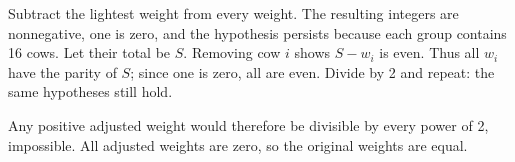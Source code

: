 Subtract the lightest weight from every weight. The resulting integers are nonnegative, one is zero, and the hypothesis persists because each group contains 16 cows. Let their total be $S$. Removing cow $i$ shows $S-w_i$ is even. Thus all $w_i$ have the parity of $S$; since one is zero, all are even. Divide by 2 and repeat: the same hypotheses still hold.

Any positive adjusted weight would therefore be divisible by every power of 2, impossible. All adjusted weights are zero, so the original weights are equal.
